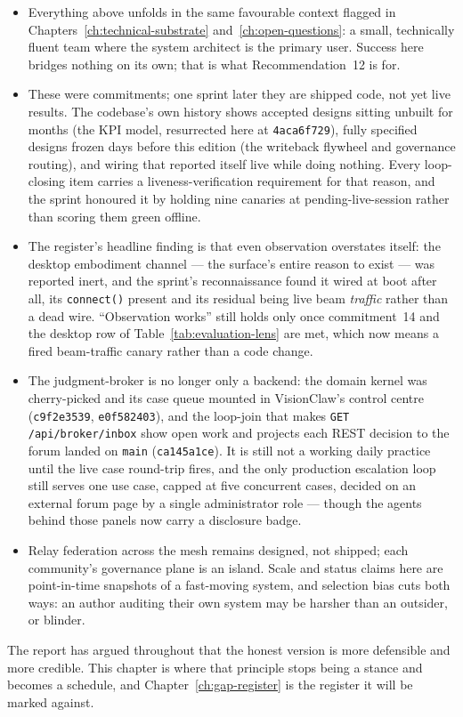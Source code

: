 \begin{cautionbox}[title={What This Chapter Does Not Claim}]
\begin{itemize}
  \item Everything above unfolds in the same favourable context flagged in Chapters~\ref{ch:technical-substrate} and~\ref{ch:open-questions}: a small, technically fluent team where the system architect is the primary user. Success here bridges nothing on its own; that is what Recommendation~12 is for.
  \item These were commitments; one sprint later they are shipped code, not yet live results. The codebase's own history shows accepted designs sitting unbuilt for months (the KPI model, resurrected here at \texttt{4aca6f729}), fully specified designs frozen days before this edition (the writeback flywheel and governance routing), and wiring that reported itself live while doing nothing. Every loop-closing item carries a liveness-verification requirement for that reason, and the sprint honoured it by holding nine canaries at pending-live-session rather than scoring them green offline.
  \item The register's headline finding is that even observation overstates itself: the desktop embodiment channel --- the surface's entire reason to exist --- was reported inert, and the sprint's reconnaissance found it wired at boot after all, its \texttt{connect()} present and its residual being live beam \emph{traffic} rather than a dead wire. ``Observation works'' still holds only once commitment~14 and the desktop row of Table~\ref{tab:evaluation-lens} are met, which now means a fired beam-traffic canary rather than a code change.
  \item The judgment-broker is no longer only a backend: the domain kernel was cherry-picked and its case queue mounted in VisionClaw's control centre (\texttt{c9f2e3539}, \texttt{e0f582403}), and the loop-join that makes \texttt{GET /api/broker/inbox} show open work and projects each REST decision to the forum landed on \texttt{main} (\texttt{ca145a1ce}). It is still not a working daily practice until the live case round-trip fires, and the only production escalation loop still serves one use case, capped at five concurrent cases, decided on an external forum page by a single administrator role --- though the agents behind those panels now carry a disclosure badge.
  \item Relay federation across the mesh remains designed, not shipped; each community's governance plane is an island. Scale and status claims here are point-in-time snapshots of a fast-moving system, and selection bias cuts both ways: an author auditing their own system may be harsher than an outsider, or blinder.
\end{itemize}
\end{cautionbox}

The report has argued throughout that the honest version is more defensible and more credible. This chapter is where that principle stops being a stance and becomes a schedule, and Chapter~\ref{ch:gap-register} is the register it will be marked against.
